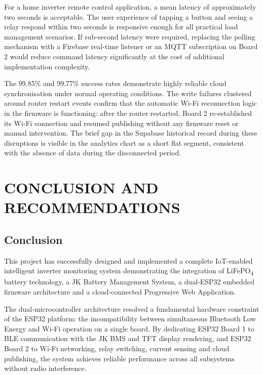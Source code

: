 \documentclass[12pt, a4paper]{report}
\begin{document}
{For a home inverter remote control application, a mean latency of
approximately two seconds is acceptable. The user experience of tapping
a button and seeing a relay respond within two seconds is responsive
enough for all practical load management scenarios. If sub-second latency
were required, replacing the polling mechanism with a Firebase real-time
listener or an MQTT subscription on Board 2 would reduce command latency
significantly at the cost of additional implementation complexity.

The 99.85\% and 99.77\% success rates demonstrate highly reliable cloud
synchronisation under normal operating conditions. The write failures
clustered around router restart events confirm that the automatic Wi-Fi
reconnection logic in the firmware is functioning: after the router
restarted, Board 2 re-established its Wi-Fi connection and resumed
publishing without any firmware reset or manual intervention. The brief
gap in the Supabase historical record during these disruptions is visible
in the analytics chart as a short flat segment, consistent with the
absence of data during the disconnected period.


\newpage
\chapter{CONCLUSION AND RECOMMENDATIONS}

\section{Conclusion}

This project has successfully designed and implemented a complete
IoT-enabled intelligent inverter monitoring system demonstrating the
integration of LiFePO\textsubscript{4} battery technology, a JK Battery
Management System, a dual-ESP32 embedded firmware architecture and a
cloud-connected Progressive Web Application.

The dual-microcontroller architecture resolved a fundamental hardware
constraint of the ESP32 platform: the incompatibility between simultaneous
Bluetooth Low Energy and Wi-Fi operation on a single board. By dedicating
ESP32 Board 1 to BLE communication with the JK BMS and TFT display
rendering, and ESP32 Board 2 to Wi-Fi networking, relay switching,
current sensing and cloud publishing, the system achieves reliable
performance across all subsystems without radio interference.

}
\end{document}
